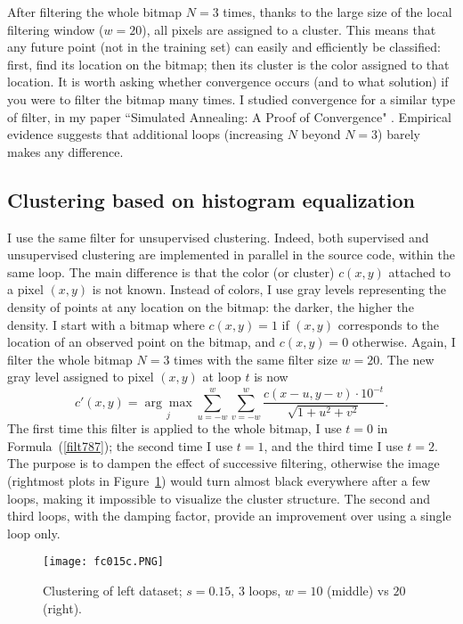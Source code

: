 \documentclass[oneside,10pt]{book}
\begin{document}
After filtering the whole bitmap $N=3$ times, thanks to the large size of the local filtering window ($w=20$), all pixels are assigned to a cluster. This means that any future point (not in the training set) can easily and efficiently be classified: first, find its location on the bitmap; then its cluster is the color assigned to that location.
It is worth asking whether convergence occurs (and to what solution) if you were to filter the bitmap many times.  I studied convergence for a similar type of filter, in my paper
``Simulated Annealing: A Proof of Convergence" \cite{vgieee}. Empirical evidence suggests that additional loops (increasing $N$ beyond $N=3$) barely makes any difference.


\subsection{Clustering based on histogram equalization}\label{fc12324}


I use the same filter for unsupervised clustering.  Indeed, both supervised and unsupervised clustering are implemented in parallel in the source code, within the same loop. The main difference is that the color (or cluster) $c(x,y)$ attached to a pixel $(x,y)$ is not known. Instead of colors, I use gray levels representing the density of points at any location on the bitmap: the darker, the higher the density. I start with a bitmap where $c(x,y)=1$ if $(x,y)$ corresponds to the location of an observed point on the bitmap, and $c(x,y)=0$ otherwise. Again, I filter the whole  bitmap $N=3$ times with the same
 filter size $w=20$. The new gray level assigned to pixel $(x,y)$ at loop $t$ is now
\begin{equation}
c'(x,y)=\underset{j}{\arg \max} \sum_{u=-w}^{w}\sum_{v=-w}^{w}\frac{c(x-u,y-v)\cdot 10^{-t}}{\sqrt{1+u^2+v^2}}. \label{filt787}
\end{equation}
The first time this filter is applied to the whole bitmap, I use $t=0$ in Formula~(\ref{filt787}); the second time I use $t=1$, and the third time I use $t=2$. The purpose is to dampen the effect of successive filtering, otherwise the image (rightmost plots in Figure~\ref{fc015c}) would turn almost black everywhere after a few loops, making it impossible to visualize the cluster structure. The second and third loops, with the damping factor, provide an improvement over using a single loop only.

\begin{figure}[H]
\centering
\texttt{[image: fc015c.PNG]}
\caption{Clustering of left dataset; $s=0.15$, $3$ loops, $w=10$ (middle) vs $20$ (right).}
\label{fc015c}
\end{figure}
\end{document}
